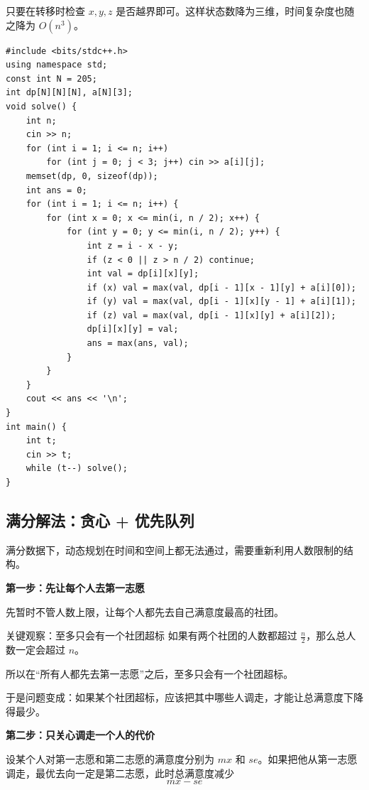 \documentclass{book}
\begin{document}
只要在转移时检查 $x,y,z$ 是否越界即可。这样状态数降为三维，时间复杂度也随之降为 $O(n^3)$。

\begin{lstlisting}[style = code]
#include <bits/stdc++.h>
using namespace std;
const int N = 205;
int dp[N][N][N], a[N][3];
void solve() {
    int n;
    cin >> n;
    for (int i = 1; i <= n; i++)
        for (int j = 0; j < 3; j++) cin >> a[i][j];
    memset(dp, 0, sizeof(dp));
    int ans = 0;
    for (int i = 1; i <= n; i++) {
        for (int x = 0; x <= min(i, n / 2); x++) {
            for (int y = 0; y <= min(i, n / 2); y++) {
                int z = i - x - y;
                if (z < 0 || z > n / 2) continue;
                int val = dp[i][x][y];
                if (x) val = max(val, dp[i - 1][x - 1][y] + a[i][0]);
                if (y) val = max(val, dp[i - 1][x][y - 1] + a[i][1]);
                if (z) val = max(val, dp[i - 1][x][y] + a[i][2]);
                dp[i][x][y] = val;
                ans = max(ans, val);
            }
        }
    }
    cout << ans << '\n';
}
int main() {
    int t;
    cin >> t;
    while (t--) solve();
}\end{lstlisting}

\subsection{满分解法：贪心 + 优先队列}

满分数据下，动态规划在时间和空间上都无法通过，需要重新利用人数限制的结构。

\par\medskip
\noindent\textbf{第一步：先让每个人去第一志愿}
\par\medskip
先暂时不管人数上限，让每个人都先去自己满意度最高的社团。

\begin{keybox}{关键观察：至多只会有一个社团超标}
如果有两个社团的人数都超过 $\frac{n}{2}$，那么总人数一定会超过 $n$。

所以在“所有人都先去第一志愿”之后，至多只会有一个社团超标。
\end{keybox}

于是问题变成：如果某个社团超标，应该把其中哪些人调走，才能让总满意度下降得最少。

\par\medskip
\noindent\textbf{第二步：只关心调走一个人的代价}
\par\medskip
设某个人对第一志愿和第二志愿的满意度分别为 $mx$ 和 $se$。如果把他从第一志愿调走，最优去向一定是第二志愿，此时总满意度减少
\[
mx - se
\]
\end{document}
